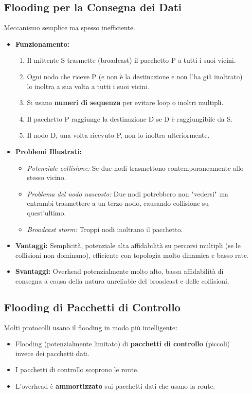 \subsection{Flooding per la Consegna dei Dati}
Meccanismo semplice ma spesso inefficiente.
\begin{itemize}
    \item \textbf{Funzionamento:}
    \begin{enumerate}
        \item Il mittente S trasmette (broadcast) il pacchetto P a tutti i suoi vicini.
        \item Ogni nodo che riceve P (e non è la destinazione e non l'ha già inoltrato) lo inoltra a sua volta a tutti i suoi vicini.
        \item Si usano \textbf{numeri di sequenza} per evitare loop o inoltri multipli.
        \item Il pacchetto P raggiunge la destinazione D se D è raggiungibile da S.
        \item Il nodo D, una volta ricevuto P, non lo inoltra ulteriormente.
    \end{enumerate}
    \item \textbf{Problemi Illustrati:}
    \begin{itemize}
        \item \textit{Potenziale collisione:} Se due nodi trasmettono contemporaneamente allo stesso vicino.
        \item \textit{Problema del nodo nascosto:} Due nodi potrebbero non "vedersi" ma entrambi trasmettere a un terzo nodo, causando collisione su quest'ultimo.
        \item \textit{Broadcast storm:} Troppi nodi inoltrano il pacchetto.
    \end{itemize}
    \item \textbf{Vantaggi:} Semplicità, potenziale alta affidabilità su percorsi multipli (se le collisioni non dominano), efficiente con topologia molto dinamica e basso rate.
    \item \textbf{Svantaggi:} Overhead potenzialmente molto alto, bassa affidabilità di consegna a causa della natura unreliable del broadcast e delle collisioni.
\end{itemize}

\subsection{Flooding di Pacchetti di Controllo}
Molti protocolli usano il flooding in modo più intelligente:
\begin{itemize}
    \item Flooding (potenzialmente limitato) di \textbf{pacchetti di controllo} (piccoli) invece dei pacchetti dati.
    \item I pacchetti di controllo scoprono le route.
    \item L'overhead è \textbf{ammortizzato} sui pacchetti dati che usano la route.
\end{itemize}

